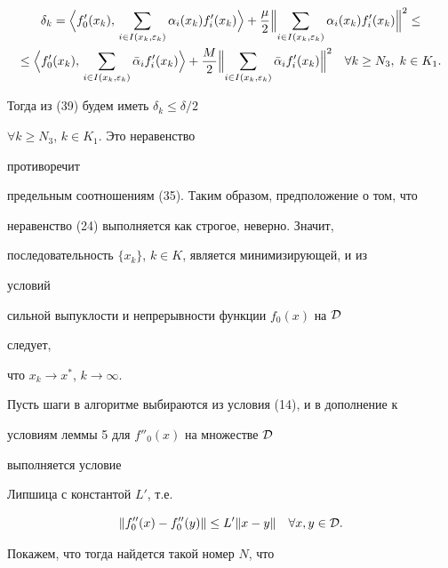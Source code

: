 \begin{pf}
\begin{multline*}
\delta_k=


\Bigl\la f'_0(x_k),\,\sum_{i\in I(x_k,\varepsilon_k)}\alpha_i(x_k)


f'_i(x_k)


\Bigr\ra+\frac{\mu}{2}\Bigl\|\sum_{i\in I(x_k,\varepsilon_k)}


\alpha_i(x_k)f'_i(x_k)\Bigr\|^2 \le \\


\le \Bigl\la f'_0(x_k),\,\sum_{i\in I(x_k,\varepsilon_k)}


\Bar\alpha_if'_i(x_k)


\Bigr\ra+\frac{M}{2}\Bigl\|\sum_{i\in I(x_k,\varepsilon_k)}


\Bar\alpha_if'_i(x_k)\Bigr\|^2\quad


\forall k\ge N_3,\; k\in K_1.


\end{multline*}


Тогда из (39) будем иметь $\delta_k\le\delta/2$


$\forall k\ge N_3$, $k\in K_1$. Это неравенство


противоречит


предельным соотношениям (35). Таким образом, предположение о том, что


неравенство (24) выполняется как строгое, неверно. Значит,


последовательность $\{x_k\}$, $k\in K$, является минимизирующей, и из


условий


сильной выпуклости и непрерывности функции $f_0(x)$ на $\cal D$


следует,


что $x_k\to x^*$, $k\to\infty$.


\end{pf}





Пусть шаги в алгоритме выбираются из условия (14), и в дополнение к


условиям леммы 5 для $f''_0(x)$ на множестве $\cal D$


выполняется условие


Липшица с константой $L'$, т.е.


$$


\|f''_0(x)-f''_0(y)\|\le L'\|x-y\|\quad


\forall x,y\in \cal D.


$$


Покажем, что тогда найдется такой номер $N$, что


